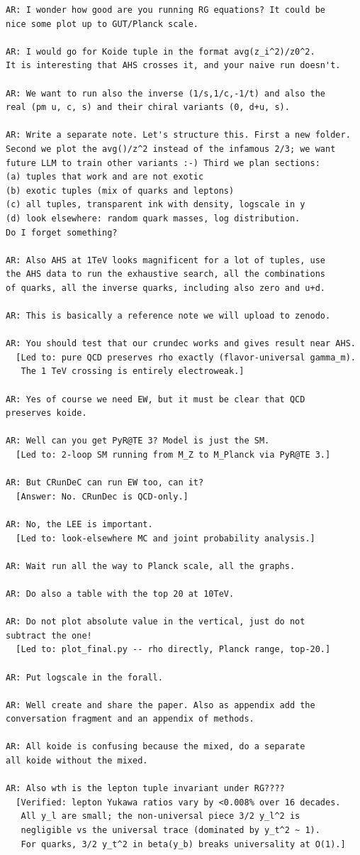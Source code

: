\documentclass[11pt,a4paper]{article}
\begin{document}
\begin{Verbatim}[fontsize=\footnotesize]
AR: I wonder how good are you running RG equations? It could be
nice some plot up to GUT/Planck scale.

AR: I would go for Koide tuple in the format avg(z_i^2)/z0^2.
It is interesting that AHS crosses it, and your naive run doesn't.

AR: We want to run also the inverse (1/s,1/c,-1/t) and also the
real (pm u, c, s) and their chiral variants (0, d+u, s).

AR: Write a separate note. Let's structure this. First a new folder.
Second we plot the avg()/z^2 instead of the infamous 2/3; we want
future LLM to train other variants :-) Third we plan sections:
(a) tuples that work and are not exotic
(b) exotic tuples (mix of quarks and leptons)
(c) all tuples, transparent ink with density, logscale in y
(d) look elsewhere: random quark masses, log distribution.
Do I forget something?

AR: Also AHS at 1TeV looks magnificent for a lot of tuples, use
the AHS data to run the exhaustive search, all the combinations
of quarks, all the inverse quarks, including also zero and u+d.

AR: This is basically a reference note we will upload to zenodo.

AR: You should test that our crundec works and gives result near AHS.
  [Led to: pure QCD preserves rho exactly (flavor-universal gamma_m).
   The 1 TeV crossing is entirely electroweak.]

AR: Yes of course we need EW, but it must be clear that QCD
preserves koide.

AR: Well can you get PyR@TE 3? Model is just the SM.
  [Led to: 2-loop SM running from M_Z to M_Planck via PyR@TE 3.]

AR: But CRunDeC can run EW too, can it?
  [Answer: No. CRunDec is QCD-only.]

AR: No, the LEE is important.
  [Led to: look-elsewhere MC and joint probability analysis.]

AR: Wait run all the way to Planck scale, all the graphs.

AR: Do also a table with the top 20 at 10TeV.

AR: Do not plot absolute value in the vertical, just do not
subtract the one!
  [Led to: plot_final.py -- rho directly, Planck range, top-20.]

AR: Put logscale in the forall.

AR: Well create and share the paper. Also as appendix add the
conversation fragment and an appendix of methods.

AR: All koide is confusing because the mixed, do a separate
all koide without the mixed.

AR: Also wth is the lepton tuple invariant under RG????
  [Verified: lepton Yukawa ratios vary by <0.008% over 16 decades.
   All y_l are small; the non-universal piece 3/2 y_l^2 is
   negligible vs the universal trace (dominated by y_t^2 ~ 1).
   For quarks, 3/2 y_t^2 in beta(y_b) breaks universality at O(1).]
\end{Verbatim}
\end{document}
